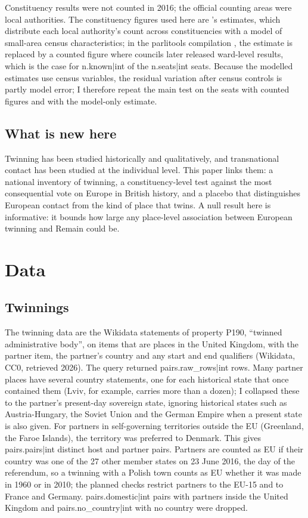 \documentclass[11pt,a4paper]{article}
\begin{document}
Constituency results were not counted in 2016; the official counting areas were local authorities. The constituency figures used here are \citet{hanretty2017}'s estimates, which distribute each local authority's count across constituencies with a model of small-area census characteristics; in the parlitools compilation \citep{parlitools}, the estimate is replaced by a counted figure where councils later released ward-level results, which is the case for {{n.known|int}} of the {{n.seats|int}} seats. Because the modelled estimates use census variables, the residual variation after census controls is partly model error; I therefore repeat the main test on the seats with counted figures and with the model-only estimate.

\subsection{What is new here}
Twinning has been studied historically and qualitatively, and transnational contact has been studied at the individual level. This paper links them: a national inventory of twinning, a constituency-level test against the most consequential vote on Europe in British history, and a placebo that distinguishes European contact from the kind of place that twins. A null result here is informative: it bounds how large any place-level association between European twinning and Remain could be.

\section{Data}\label{sec:data}
\subsection{Twinnings}
The twinning data are the Wikidata statements of property P190, ``twinned administrative body'', on items that are places in the United Kingdom, with the partner item, the partner's country and any start and end qualifiers (Wikidata, CC0, retrieved 2026). The query returned {{pairs.raw_rows|int}} rows. Many partner places have several country statements, one for each historical state that once contained them (Lviv, for example, carries more than a dozen); I collapsed these to the partner's present-day sovereign state, ignoring historical states such as Austria-Hungary, the Soviet Union and the German Empire when a present state is also given. For partners in self-governing territories outside the EU (Greenland, the Faroe Islands), the territory was preferred to Denmark. This gives {{pairs.pairs|int}} distinct host and partner pairs. Partners are counted as EU if their country was one of the 27 other member states on 23 June 2016, the day of the referendum, so a twinning with a Polish town counts as EU whether it was made in 1960 or in 2010; the planned checks restrict partners to the EU-15 and to France and Germany. {{pairs.domestic|int}} pairs with partners inside the United Kingdom and {{pairs.no_country|int}} with no country were dropped.
\end{document}
